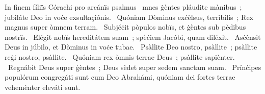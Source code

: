 { In finem fíliïs Córachi pro arcánïs psalmus}
{%
~mnes ġèntes pláudite mànibus~; jubiláte Deo in voċe exsultaçiónis. 
~Quóniam Dòminus exċèlsus, terrìbilis~; Rex magnus super òmnem terram. 
~Subjéċit pòpulos nobïs, et ġèntes sub pèdibus nostrïs. 
~Elégit nobïs hereditátem suam~; spèċiem Jacóbi, quam diléxit. 
~Asċènsit Deus in júbilo, et Dòminus in voċe tubae. 
~Psàllite Deo nostro, psàllite~; psàllite reġi nostro, psàllite. 
~Quóniam rex òmnis terrae Deus~; psàllite sapiènter. 
~Regnábit Deus super ġèntes~; Deus sèdet super sedem sanctam suam. 
~Prínċipes populórum congregáti sunt cum Deo Abrahámi, quóniam dei fortes terrae vehemènter eleváti sunt. 
}
